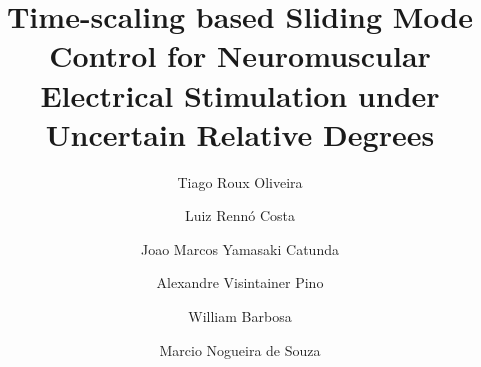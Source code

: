 \documentclass[review]{elsarticle}
\begin{document}
\begin{frontmatter}

\title{Time-scaling based Sliding Mode Control for Neuromuscular Electrical Stimulation under\\ Uncertain Relative Degrees }


\author[mymainaddress]{Tiago Roux Oliveira}
\author[mysecondaryaddress]{Luiz Renn\'{o} Costa}
\author[mysecondaryaddress]{Joao Marcos Yamasaki Catunda}
\author[mysecondaryaddress]{Alexandre Visintainer Pino}
\author[mymainaddress]{William Barbosa}
\author[mysecondaryaddress]{Marcio Nogueira de Souza}


\address[mymainaddress]{Dept. of Electronics and Telecommunications, State University of Rio de Janeiro (UERJ), Rio de Janeiro, RJ 20550-900, Brazil.}
\address[mysecondaryaddress]{Biomedical Engineering Program, Federal University of Rio de Janeiro (COPPE/UFRJ), Rio de Janeiro, RJ 21945-970,
P.O. Box 68510, Brazil.}




\end{frontmatter}
\end{document}
